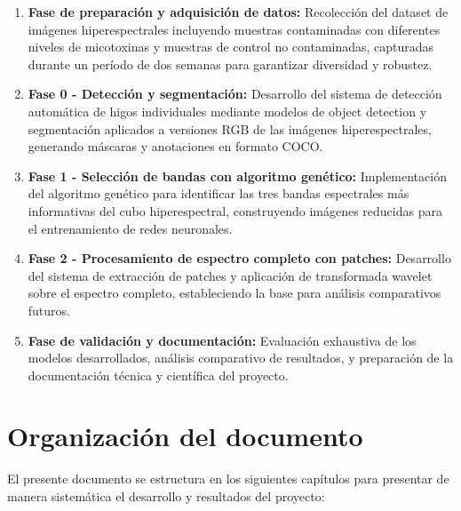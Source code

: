 \begin{enumerate}
    \item \textbf{Fase de preparación y adquisición de datos:} Recolección del dataset de imágenes hiperespectrales incluyendo muestras contaminadas con diferentes niveles de micotoxinas y muestras de control no contaminadas, capturadas durante un período de dos semanas para garantizar diversidad y robustez.
    \item \textbf{Fase 0 - Detección y segmentación:} Desarrollo del sistema de detección automática de higos individuales mediante modelos de object detection y segmentación aplicados a versiones RGB de las imágenes hiperespectrales, generando máscaras y anotaciones en formato COCO.
    \item \textbf{Fase 1 - Selección de bandas con algoritmo genético:} Implementación del algoritmo genético para identificar las tres bandas espectrales más informativas del cubo hiperespectral, construyendo imágenes reducidas para el entrenamiento de redes neuronales.
    \item \textbf{Fase 2 - Procesamiento de espectro completo con patches:} Desarrollo del sistema de extracción de patches y aplicación de transformada wavelet sobre el espectro completo, estableciendo la base para análisis comparativos futuros.
    \item \textbf{Fase de validación y documentación:} Evaluación exhaustiva de los modelos desarrollados, análisis comparativo de resultados, y preparación de la documentación técnica y científica del proyecto.
\end{enumerate}

\section{Organización del documento}
El presente documento se estructura en los siguientes capítulos para presentar de manera sistemática el desarrollo y resultados del proyecto:

